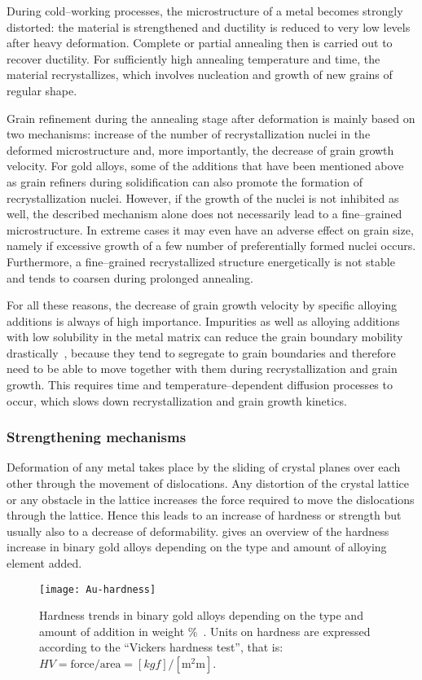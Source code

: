 During cold--working processes, the microstructure of a metal becomes strongly distorted: the material is strengthened and ductility is reduced to very low levels after heavy deformation. Complete or partial annealing then is carried out to recover ductility. For sufficiently high annealing temperature and time, the material recrystallizes, which involves nucleation and growth of new grains of regular shape.

Grain refinement during the annealing stage after deformation is mainly based on two mechanisms: increase of the number of recrystallization nuclei in the deformed microstructure and, more importantly, the decrease of grain growth velocity. For gold alloys, some of the additions that have been mentioned above as grain refiners during solidification can also promote the formation of recrystallization nuclei. However, if the growth of the nuclei is not inhibited as well, the described mechanism alone does not necessarily lead to a fine--grained microstructure. In extreme cases it may even have an adverse effect on grain size, namely if excessive growth of a few number of preferentially formed nuclei occurs. Furthermore, a fine--grained recrystallized structure energetically is not stable and tends to coarsen during prolonged annealing.

For all these reasons, the decrease of grain growth velocity by specific alloying additions is always of high importance. Impurities as well as alloying additions with low solubility in the metal matrix can reduce the grain boundary mobility drastically~\cite{Humphreys2004,Lucke1957}, because they tend to segregate to grain boundaries and therefore need to be able to move together with them during recrystallization and grain growth. This requires time and temperature--dependent diffusion processes to occur, which slows down recrystallization and grain growth kinetics.




\subsubsection{Strengthening mechanisms}
Deformation of any metal takes place by the sliding of crystal planes over each other through the movement of dislocations. Any distortion of the crystal lattice or any obstacle in the lattice increases the force required to move the dislocations through the lattice. Hence this leads to an increase of hardness or strength but usually also to a decrease of deformability.  gives an overview of the hardness increase in binary gold alloys depending on the type and amount of alloying element added.
\begin{figure}[bt]
\begin{center}
\texttt{[image: Au-hardness]}
\caption{Hardness trends in binary gold alloys depending on the type and amount of addition in weight \%~\cite{MetalPocketbook1995}. Units on hardness are expressed according to the ``Vickers hardness test'', that is: $HV=\text{force}/\text{area} = [\si{kgf}]/[\si{\square\milli\metre}]$.}
\label{fig:Au-hardness}
\end{center}
\end{figure}

